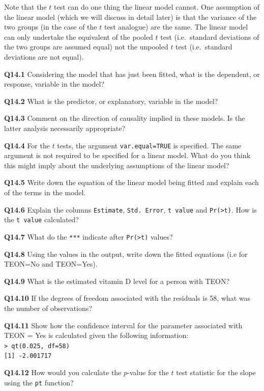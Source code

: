 \documentclass[
  oneside]{krantz}
\begin{document}
Note that the \(t\) test can do one thing the linear model cannot. One assumption of the linear model (which we will discuss in detail later) is that the variance of the two groups (in the case of the \(t\) test analogue) are the same. The linear model can only undertake the equivalent of the pooled \(t\) test (i.e.~standard deviations of the two groups are assumed equal) not the unpooled \(t\) test (i.e.~standard deviations are not equal).

\textbf{Q14.1} Considering the model that has just been fitted, what is the dependent, or response, variable in the model?

\textbf{Q14.2} What is the predictor, or explanatory, variable in the model?

\textbf{Q14.3} Comment on the direction of causality implied in these models. Is the latter analysis necessarily appropriate?

\textbf{Q14.4} For the \(t\) tests, the argument \texttt{var.equal=TRUE} is specified. The same argument is not required to be specified for a linear model. What do you think this might imply about the underlying assumptions of the linear model?

\textbf{Q14.5} Write down the equation of the linear model being fitted and explain each of the terms in the model.

\textbf{Q14.6} Explain the columns \texttt{Estimate}, \texttt{Std.\ Error}, \texttt{t\ value} and \texttt{Pr(\textgreater{}\textbar{}t\textbar{})}. How is the \texttt{t\ value} calculated?

\textbf{Q14.7} What do the \texttt{***} indicate after \texttt{Pr(\textgreater{}\textbar{}t\textbar{})} values?

\textbf{Q14.8} Using the values in the output, write down the fitted equations (i.e for TEON=No and TEON=Yes).

\textbf{Q14.9} What is the estimated vitamin D level for a person with TEON?

\textbf{Q14.10} If the degrees of freedom associated with the residuals is 58, what was the number of observations?

\textbf{Q14.11} Show how the confidence interval for the parameter associated with TEON = Yes is calculated given the following information:\\
\texttt{\textgreater{}\ qt(0.025,\ df=58)}~\\
\texttt{{[}1{]}\ -2.001717}

\textbf{Q14.12} How would you calculate the \(p\)-value for the \(t\) test statistic for the slope using the \texttt{pt} function?
\end{document}
